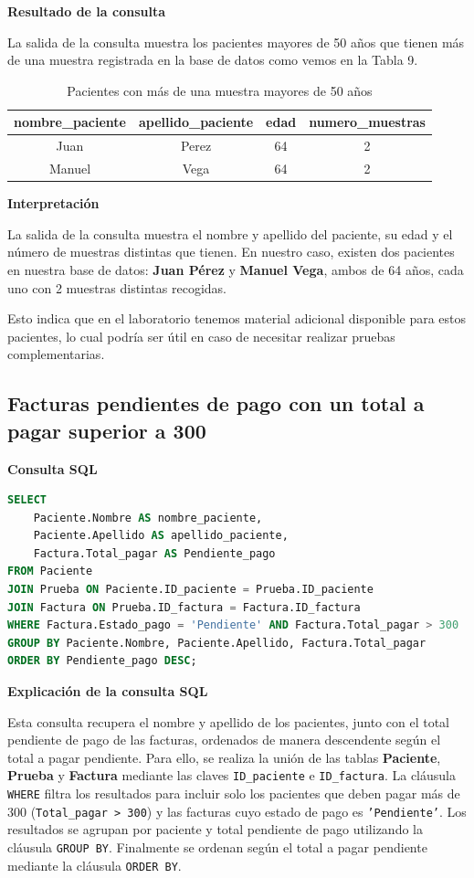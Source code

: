 \documentclass[spanish]{article}
\begin{document}
\textbf{Resultado de la consulta}

La salida de la consulta muestra los pacientes mayores de 50 años que tienen más de una muestra registrada en la base de datos como vemos en la Tabla 9.

\begin{table}[h!]
\centering
\begin{tabular}{|c|c|c|c|}
\hline
\textbf{nombre\_paciente} & \textbf{apellido\_paciente} & \textbf{edad} & \textbf{numero\_muestras} \\
\hline
Juan & Perez & 64 & 2 \\
\hline
Manuel & Vega & 64 & 2 \\
\hline
\end{tabular}
\caption{Pacientes con más de una muestra mayores de 50 años}
\label{tab:pacientes_muestras}
\end{table}

\textbf{Interpretación}

La salida de la consulta muestra el nombre y apellido del paciente, su edad y el número de muestras distintas que tienen. En nuestro caso, existen dos pacientes en nuestra base de datos: \textbf{Juan Pérez} y \textbf{Manuel Vega}, ambos de 64 años, cada uno con 2 muestras distintas recogidas. 

Esto indica que en el laboratorio tenemos material adicional disponible para estos pacientes, lo cual podría ser útil en caso de necesitar realizar pruebas complementarias.


\subsection{Facturas pendientes de pago con un total a pagar superior a 300}

\textbf{Consulta SQL}
\begin{lstlisting}[language=SQL]
SELECT 
    Paciente.Nombre AS nombre_paciente, 
    Paciente.Apellido AS apellido_paciente, 
    Factura.Total_pagar AS Pendiente_pago
FROM Paciente
JOIN Prueba ON Paciente.ID_paciente = Prueba.ID_paciente
JOIN Factura ON Prueba.ID_factura = Factura.ID_factura
WHERE Factura.Estado_pago = 'Pendiente' AND Factura.Total_pagar > 300
GROUP BY Paciente.Nombre, Paciente.Apellido, Factura.Total_pagar
ORDER BY Pendiente_pago DESC;
\end{lstlisting}

\textbf{Explicación de la consulta SQL}

Esta consulta recupera el nombre y apellido de los pacientes, junto con el total pendiente de pago de las facturas, ordenados de manera descendente según el total a pagar pendiente. Para ello, se realiza la unión de las tablas \textbf{Paciente}, \textbf{Prueba} y \textbf{Factura} mediante las claves \texttt{ID\_paciente} e \texttt{ID\_factura}. La cláusula \texttt{WHERE} filtra los resultados para incluir solo los pacientes que deben pagar más de 300 (\texttt{Total\_pagar > 300}) y las facturas cuyo estado de pago es \texttt{'Pendiente'}. Los resultados se agrupan por paciente y total pendiente de pago utilizando la cláusula \texttt{GROUP BY}. Finalmente se ordenan según el total a pagar pendiente mediante la cláusula \texttt{ORDER BY}.
\end{document}

